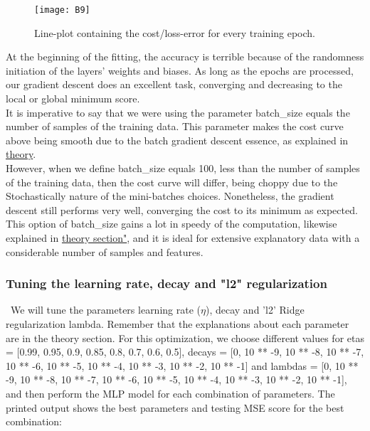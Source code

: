 \begin{figure}[H]
\label{fig:B6}
\centering
\texttt{[image: B9]}
\caption{Line-plot containing the cost/loss-error for every training epoch.}
\end{figure}

At the beginning of the fitting, the accuracy is terrible because of the randomness initiation of the layers' weights and biases. As long as the epochs are processed, our gradient descent does an excellent task, converging and decreasing to the local or global minimum score.\\

It is imperative to say that we were using the parameter batch\_size equals the number of samples of the training data. This parameter makes the cost curve above being smooth due to the batch gradient descent essence, as explained in \hyperref[chap:Mini-batch Stochastic Gradient Decedent]{theory}.\\

However, when we define batch\_size equals 100, less than the number of samples of the training data, then the cost curve will differ, being choppy due to the Stochastically nature of the mini-batches choices. Nonetheless, the gradient descent still performs very well, converging the cost to its minimum as expected. This option of batch\_size gains a lot in speedy of the computation, likewise explained in \hyperref[chap:Mini-batch Stochastic Gradient Decedent]{theory section"}, and it is ideal for extensive explanatory data with a considerable number of samples and features.

\subsubsection{Tuning the learning rate, decay and "l2" regularization}
\label{chap:Tuning the learning rate, decay and "l2" regularization}

\quad \, We will tune the parameters learning rate ($\eta$), decay and 'l2' Ridge regularization lambda. Remember that the explanations about each parameter are in the theory section. For this optimization, we choose different values for etas = [0.99, 0.95, 0.9, 0.85, 0.8, 0.7, 0.6, 0.5], decays = [0, 10 ** -9, 10 ** -8, 10 ** -7, 10 ** -6, 10 ** -5, 10 ** -4, 10 ** -3, 10 ** -2, 10 ** -1] and lambdas = [0, 10 ** -9, 10 ** -8, 10 ** -7, 10 ** -6, 10 ** -5, 10 ** -4, 10 ** -3, 10 ** -2, 10 ** -1], and then perform the MLP model for each combination of parameters. The printed output shows the best parameters and testing MSE score for the best combination:

